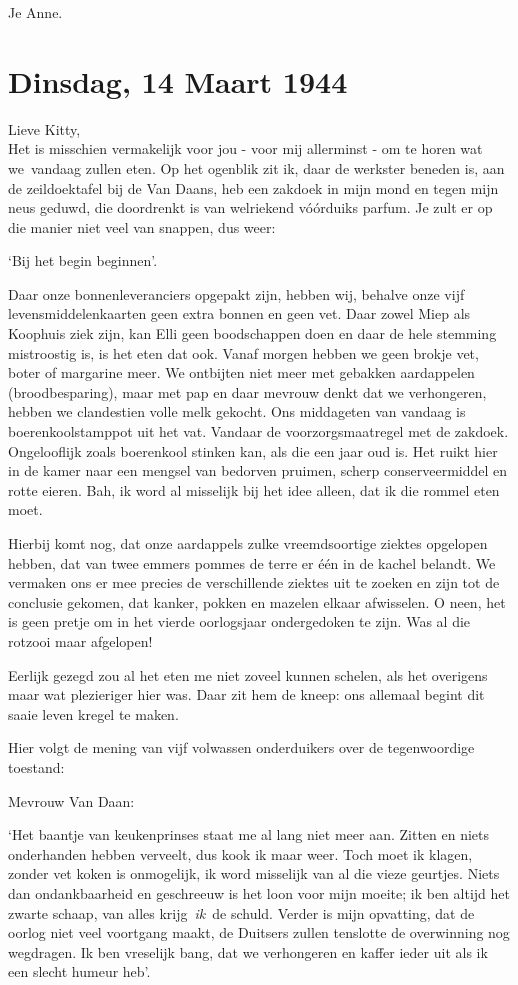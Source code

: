 \documentclass{book}
\begin{document}
Je Anne.

\section*{Dinsdag, 14 Maart 1944}

Lieve Kitty,\\
Het is misschien vermakelijk voor jou - voor mij allerminst - om
te horen wat we~vandaag zullen eten. Op het ogenblik zit ik, daar de werkster
beneden is, aan de zeildoektafel bij de Van Daans, heb een zakdoek in mijn mond
en tegen mijn neus geduwd, die doordrenkt is van welriekend vóórduiks parfum. Je
zult er op die manier niet veel van snappen, dus weer:

`Bij het begin beginnen'.

Daar onze bonnenleveranciers opgepakt zijn, hebben wij, behalve onze vijf
levensmiddelenkaarten geen extra bonnen en geen vet. Daar zowel Miep als
Koophuis ziek zijn, kan Elli geen boodschappen doen en daar de hele stemming
mistroostig is, is het eten dat ook. Vanaf morgen hebben we geen brokje vet,
boter of margarine meer. We ontbijten niet meer met gebakken aardappelen
(broodbesparing), maar met pap en daar mevrouw denkt dat we verhongeren, hebben
we clandestien volle melk gekocht. Ons middageten van vandaag is
boerenkoolstamppot uit het vat. Vandaar de voorzorgsmaatregel met de zakdoek.
Ongelooflijk zoals boerenkool stinken kan, als die een jaar oud is. Het ruikt
hier in de kamer naar een mengsel van bedorven pruimen, scherp conserveermiddel
en rotte eieren.  Bah, ik word al misselijk bij het idee alleen, dat ik die
rommel eten moet.

Hierbij komt nog, dat onze aardappels zulke vreemdsoortige ziektes opgelopen
hebben, dat van twee emmers pommes de terre er één in de kachel belandt. We
vermaken ons er mee precies de verschillende ziektes uit te zoeken en zijn tot
de conclusie gekomen, dat kanker, pokken en mazelen elkaar afwisselen. O neen,
het is geen pretje om in het vierde oorlogsjaar ondergedoken te zijn. Was al die
rotzooi maar afgelopen!

Eerlijk gezegd zou al het eten me niet zoveel kunnen schelen, als het overigens
maar wat plezieriger hier was. Daar zit hem de kneep: ons allemaal begint dit
saaie leven kregel te maken.

Hier volgt de mening van vijf volwassen onderduikers over de tegenwoordige
toestand:

Mevrouw Van Daan:

`Het baantje van keukenprinses staat me al lang niet meer aan. Zitten en niets
onderhanden hebben verveelt, dus kook ik maar weer. Toch moet ik klagen, zonder
vet koken is onmogelijk, ik word misselijk van al die vieze geurtjes. Niets dan
ondankbaarheid en geschreeuw is het loon voor mijn moeite; ik ben altijd het
zwarte schaap, van alles krijg~\emph{ik}~de schuld. Verder is mijn opvatting,
dat de oorlog niet veel voortgang maakt, de Duitsers zullen tenslotte de
overwinning nog wegdragen. Ik ben vreselijk bang, dat we verhongeren en kaffer
ieder uit als ik een slecht humeur heb'.
\end{document}
